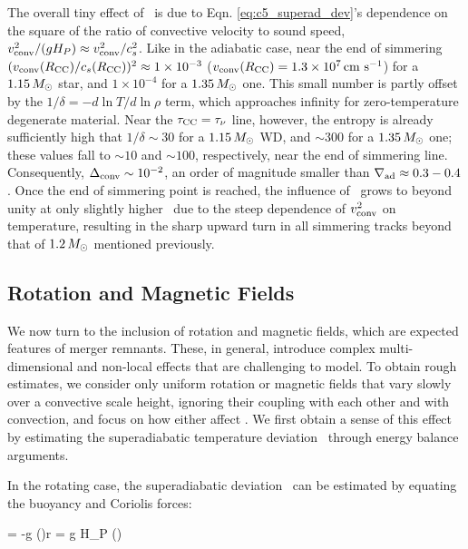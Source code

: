 The overall tiny effect of \dnabconv\ is due to Eqn. \ref{eq:c5_superad_dev}'s dependence on the square of the ratio of convective velocity to sound speed, $\vconv^2/(g H_P) \approx \vconv^2/c_s^2$.  Like in the adiabatic case, near the end of simmering $(\vconvrcc/c_s(\Rcc))^2 \approx 1\times10^{-3}$ ($\vconvrcc = 1.3\times10^7\,\cmpsec$) for a $1.15\,\Msun$ star, and $1\times10^{-4}$ for a $1.35\,\Msun$ one.  This small number is partly offset by the $1/\delta = -d\ln T/d\ln \rho$ term, which approaches infinity for zero-temperature degenerate material.  Near the $\taucc = \taunu$ line, however, the entropy is already sufficiently high that $1/\delta \sim 30$ for a $1.15\,\Msun$ WD, and $\sim 300$ for a $1.35\,\Msun$ one; these values fall to $\sim 10$ and $\sim 100$, respectively, near the end of simmering line.  Consequently, $\dnabconv \sim 10^{-2}$, an order of magnitude smaller than $\nablaad \approx 0.3 - 0.4$.  Once the end of simmering point is reached, the influence of \dnabconv\ grows to beyond unity at only slightly higher \Sc\ due to the steep dependence of $\vconv^2$ on temperature, resulting in the sharp upward turn in all simmering tracks beyond that of $1.2\,\Msun$ mentioned previously.

\subsection{Rotation and Magnetic Fields}
\label{ssec:c5_rotmag}


We now turn to the inclusion of rotation and magnetic fields, which are expected features of merger remnants.  These, in general, introduce complex multi-dimensional and non-local effects that are challenging to model.  To obtain rough estimates, we consider only uniform rotation or magnetic fields that vary slowly over a convective scale height, ignoring their coupling with each other and with convection, and focus on how either affect \Mcrit.  We first obtain a sense of this effect by estimating the superadiabatic temperature deviation \deltanab\ through energy balance arguments.

In the rotating case, the superadiabatic deviation \dnabrot\ can be estimated by equating the buoyancy and Coriolis forces:

\rho\Omega\vconv = -g \left(\right)\Delta r = g H_P \rho \left(\dnabrot\right)
\label{eq:c5_dnabrot_est_work}
\eqend

